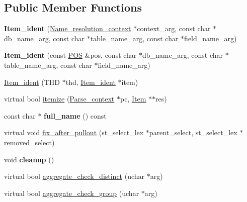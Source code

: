 \subsection*{Public Member Functions}
\begin{DoxyCompactItemize}
\item 
\mbox{\label{classItem__ident_a14b34952ff4496ee73782f9d67773f1d}} 
{\bfseries Item\+\_\+ident} (\mbox{\hyperlink{structName__resolution__context}{Name\+\_\+resolution\+\_\+context}} $\ast$context\+\_\+arg, const char $\ast$db\+\_\+name\+\_\+arg, const char $\ast$table\+\_\+name\+\_\+arg, const char $\ast$field\+\_\+name\+\_\+arg)
\item 
\mbox{\label{classItem__ident_a564baec33c27c06fc0957059b04ead5a}} 
{\bfseries Item\+\_\+ident} (const \mbox{\hyperlink{structYYLTYPE}{P\+OS}} \&pos, const char $\ast$db\+\_\+name\+\_\+arg, const char $\ast$table\+\_\+name\+\_\+arg, const char $\ast$field\+\_\+name\+\_\+arg)
\item 
\mbox{\hyperlink{classItem__ident_a1ad10c05cb6971dd58d4b3082bc31f06}{Item\+\_\+ident}} (T\+HD $\ast$thd, \mbox{\hyperlink{classItem__ident}{Item\+\_\+ident}} $\ast$item)
\item 
virtual bool \mbox{\hyperlink{classItem__ident_a05720124bb45a772f712d514650e745e}{itemize}} (\mbox{\hyperlink{structParse__context}{Parse\+\_\+context}} $\ast$pc, \mbox{\hyperlink{classItem}{Item}} $\ast$$\ast$res)
\item 
\mbox{\label{classItem__ident_a67b1c0cc22b3c6e9742e5d4fd0b9d3e0}} 
const char $\ast$ {\bfseries full\+\_\+name} () const
\item 
virtual void \mbox{\hyperlink{classItem__ident_aef2c77c01832da121180c1a74d3873b5}{fix\+\_\+after\+\_\+pullout}} (st\+\_\+select\+\_\+lex $\ast$parent\+\_\+select, st\+\_\+select\+\_\+lex $\ast$removed\+\_\+select)
\item 
\mbox{\label{classItem__ident_a748fe43d5afc9fa010059d4c62298879}} 
void {\bfseries cleanup} ()
\item 
virtual bool \mbox{\hyperlink{classItem__ident_a00ab5f763e017d4892db3d07fc8b13f3}{aggregate\+\_\+check\+\_\+distinct}} (uchar $\ast$arg)
\item 
virtual bool \mbox{\hyperlink{classItem__ident_ae79407fb0ebd076c5a45f16f36512724}{aggregate\+\_\+check\+\_\+group}} (uchar $\ast$arg)
$$
\end{DoxyCompactItemize}
